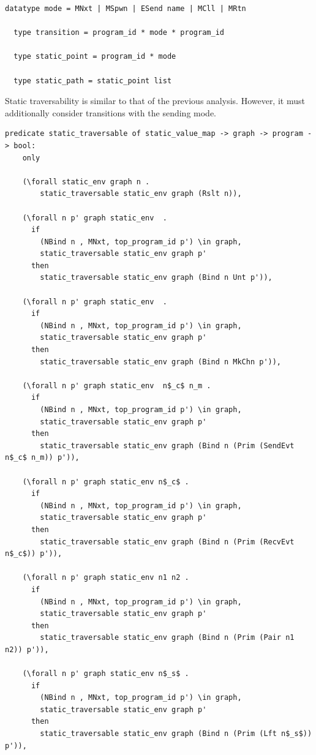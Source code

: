 \documentclass[10pt]{article}
\begin{document}
\begin{lstlisting}[language=logic, mathescape]
  datatype mode = MNxt | MSpwn | ESend name | MCll | MRtn

  type transition = program_id * mode * program_id

  type static_point = program_id * mode

  type static_path = static_point list
\end{lstlisting}

Static traversability is similar to that of the previous analysis.
However, it must additionally consider transitions with the sending mode. 

\begin{lstlisting}[language=logic, mathescape]
  predicate static_traversable of static_value_map -> graph -> program -> bool:
    only
    
    (\forall static_env graph n .
        static_traversable static_env graph (Rslt n)),

    (\forall n p' graph static_env  .
      if
        (NBind n , MNxt, top_program_id p') \in graph,
        static_traversable static_env graph p'
      then
        static_traversable static_env graph (Bind n Unt p')),

    (\forall n p' graph static_env  .
      if
        (NBind n , MNxt, top_program_id p') \in graph,
        static_traversable static_env graph p'
      then
        static_traversable static_env graph (Bind n MkChn p')),

    (\forall n p' graph static_env  n$_c$ n_m .
      if
        (NBind n , MNxt, top_program_id p') \in graph,
        static_traversable static_env graph p'
      then
        static_traversable static_env graph (Bind n (Prim (SendEvt n$_c$ n_m)) p')),

    (\forall n p' graph static_env n$_c$ .
      if
        (NBind n , MNxt, top_program_id p') \in graph,
        static_traversable static_env graph p'
      then
        static_traversable static_env graph (Bind n (Prim (RecvEvt n$_c$)) p')),

    (\forall n p' graph static_env n1 n2 .
      if
        (NBind n , MNxt, top_program_id p') \in graph,
        static_traversable static_env graph p'
      then
        static_traversable static_env graph (Bind n (Prim (Pair n1 n2)) p')),

    (\forall n p' graph static_env n$_s$ .
      if
        (NBind n , MNxt, top_program_id p') \in graph,
        static_traversable static_env graph p'
      then
        static_traversable static_env graph (Bind n (Prim (Lft n$_s$)) p')),


\end{lstlisting}
\end{document}
